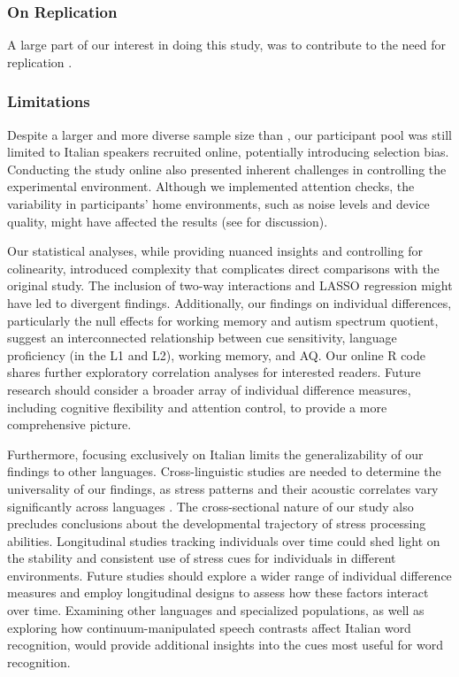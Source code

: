 \subsubsection{On Replication}
A large part of our interest in doing this study, was to contribute to the need for replication \cite{Marsden_2018}.   

\subsubsection{Limitations}

Despite a larger and more diverse sample size than \cite{Sulpizio_McQueen_2012}, our participant pool was still limited to Italian speakers recruited online, potentially introducing selection bias. Conducting the study online also presented inherent challenges in controlling the experimental environment. Although we implemented attention checks, the variability in participants' home environments, such as noise levels and device quality, might have affected the results (see \cite{bramlett_wiener_24-AOW} for discussion).

Our statistical analyses, while providing nuanced insights and controlling for colinearity, introduced complexity that complicates direct comparisons with the original study. The inclusion of two-way interactions and LASSO regression might have led to divergent findings. Additionally, our findings on individual differences, particularly the null effects for working memory and autism spectrum quotient, suggest an interconnected relationship between cue sensitivity, language proficiency (in the L1 and L2), working memory, and AQ. Our online R code shares further exploratory correlation analyses for interested readers. Future research should consider a broader array of individual difference measures, including cognitive flexibility and attention control, to provide a more comprehensive picture.

Furthermore, focusing exclusively on Italian limits the generalizability of our findings to other languages. Cross-linguistic studies are needed to determine the universality of our findings, as stress patterns and their acoustic correlates vary significantly across languages \cite{cutler2007dutch}. The cross-sectional nature of our study also precludes conclusions about the developmental trajectory of stress processing abilities. Longitudinal studies tracking individuals over time could shed light on the stability and consistent use of stress cues for individuals in different environments. Future studies should explore a wider range of individual difference measures and employ longitudinal designs to assess how these factors interact over time. Examining other languages and specialized populations, as well as exploring how continuum-manipulated speech contrasts affect Italian word recognition, would provide additional insights into the cues most useful for word recognition.

